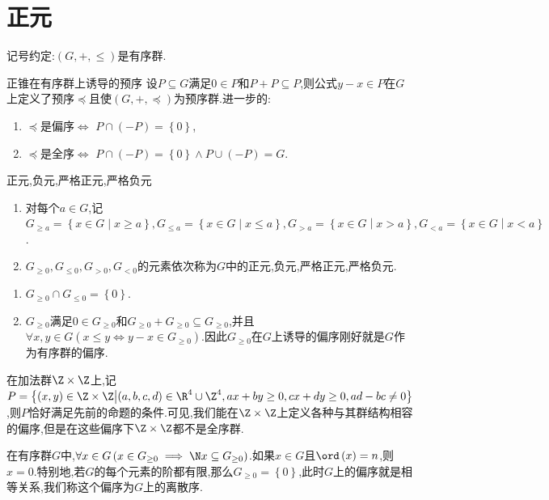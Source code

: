 \section{正元}

记号约定:$\left(G,+,\leq\right)$是有序群.

\begin{proposition}{正锥在有序群上诱导的预序}{}
	设$P\subseteq G$满足$0\in P$和$P+P\subseteq P$,则公式$y-x\in P$在$G$上定义了预序$\preccurlyeq$且使$\left(G,+,\preccurlyeq\right)$为预序群.进一步的:
	\begin{enumerate}
		\item $\preccurlyeq$是偏序$\iff$ $P\cap\left(-P\right)=\left\{0\right\}$,
		\item $\preccurlyeq$是全序$\iff$ $P\cap\left(-P\right)=\left\{0\right\}\wedge P\cup\left(-P\right)=G$.
	\end{enumerate}
\end{proposition}

\begin{definition}{正元,负元,严格正元,严格负元}{}
	\begin{enumerate}
		\item 对每个$a\in G$,记$G_{\geqslant a}=\left\{x\in G\middle|x\geqslant a\right\},G_{\leqslant a}=\left\{x\in G\middle|x\leqslant a\right\},G_{>a}=\left\{x\in G\middle|x>a\right\},G_{<a}=\left\{x\in G\middle|x<a\right\}$.
		\item $G_{\geqslant 0},G_{\leqslant 0},G_{>0},G_{<0}$的元素依次称为$G$中的正元,负元,严格正元,严格负元.
	\end{enumerate}
\end{definition}

\begin{remark}{}{}
	\begin{enumerate}
		\item $G_{\geq 0}\cap G_{\leq 0}=\left\{0\right\}$.
		\item $G_{\geq 0}$满足$0\in G_{\geq 0}$和$G_{\geq 0}+G_{\geq 0}\subseteq G_{\geq 0}$,并且$\forall x,y\in G\left(x\leq y\iff y-x\in G_{\geq 0}\right)$.因此$G_{\geq 0}$在$G$上诱导的偏序刚好就是$G$作为有序群的偏序.
	\end{enumerate}
\end{remark}

\begin{example}{}{}
	在加法群$\Z\times\Z$上,记$P=\left\{\left(x,y\right)\in\Z\times\Z\middle|\left(a,b,c,d\right)\in\R^{4}\cup\Z^{4},ax+by\geq 0,cx+dy\geq 0,ad-bc\neq 0\right\}$,则$P$恰好满足先前的命题的条件.可见,我们能在$\Z\times\Z$上定义各种与其群结构相容的偏序,但是在这些偏序下$\Z\times\Z$都不是全序群.
\end{example}

\begin{remark}{}{}
	在有序群$G$中,$\forall x\in G\left(x\in G_{\geq 0}\implies \N x\subseteq G_{\geq 0}\right)$.如果$x\in G$且$\ord\left(x\right)=n$,则$x=0$.特别地,若$G$的每个元素的阶都有限,那么$G_{\geq 0}=\left\{0\right\}$,此时$G$上的偏序就是相等关系,我们称这个偏序为$G$上的离散序.
\end{remark}